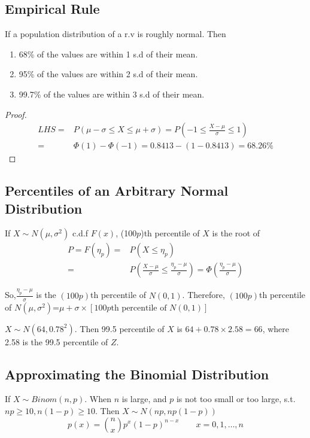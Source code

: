 \subsection{Empirical Rule}
If a population distribution of a r.v is roughly normal. Then
\begin{enumerate}
\item 68\% of the values are within 1 s.d of their mean.
\item 95\% of the values are within 2 s.d of their mean.
\item 99.7\% of the values are within 3 s.d of their mean.
\end{enumerate}
\begin{proof}
\begin{align*}
LHS=&P(\mu-\sigma \leq X \leq \mu+\sigma)=P(-1 \leq\frac{X-\mu}{\sigma}\leq 1)\\
=&\Phi(1)-\Phi(-1)=0.8413-(1-0.8413)=68.26\%
\end{align*}
\end{proof}

\subsection{Percentiles of an Arbitrary Normal Distribution}
If $X\sim N(\mu,\sigma^2)$ c.d.f $F(x)$, (100$p$)th percentile of $X$ is the root of 
\begin{align*}
P=F(\eta_p)=&P(X \leq \eta_p)\\ 
=&P\left(\frac{X-\mu}{\sigma} \leq \frac{\eta_p-\mu}{\sigma} \right)=\Phi\left( \frac{\eta_p-\mu}{\sigma} \right)
\end{align*}

So,$\frac{\eta_p-\mu}{\sigma}$ is the $(100p)$th percentile of $N(0,1)$. Therefore, $(100p)$th percentile of $N(\mu,\sigma^2)$=$\mu+\sigma\times[100p\text{th percentile of }N(0,1)]$

\begin{exmp}
$X \sim N(64,0.78^2)$. Then 99.5 percentile of $X$ is $64+0.78\times 2.58=66$, where 2.58 is the 99.5 percentile of $Z$. 
\end{exmp}

\subsection{Approximating the Binomial Distribution}
If $X \sim Binom(n,p)$. When $n$ is large, and $p$ is not too small or too large, s.t. $np \geq 10, n(1-p) \geq 10$. Then $X \sim N(np,np(1-p))$
\[p(x)=\binom nx p^x (1-p)^{n-x} \qquad x=0,1,\dots,n\]

